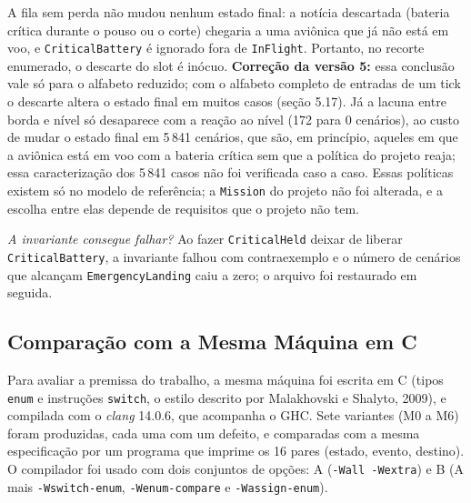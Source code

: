 \documentclass[12pt,a4paper]{article}
\begin{document}
A fila sem perda não mudou nenhum estado final: a notícia descartada (bateria crítica durante o pouso ou o corte) chegaria a uma aviônica que já não está em voo, e \texttt{CriticalBattery} é ignorado fora de \texttt{InFlight}. Portanto, no recorte enumerado, o descarte do slot é inócuo. \textbf{Correção da versão 5:} essa conclusão vale só para o alfabeto reduzido; com o alfabeto completo de entradas de um tick o descarte altera o estado final em muitos casos (seção 5.17). Já a lacuna entre borda e nível só desaparece com a reação ao nível (172 para 0 cenários), ao custo de mudar o estado final em 5\,841 cenários, que são, em princípio, aqueles em que a aviônica está em voo com a bateria crítica sem que a política do projeto reaja; essa caracterização dos 5\,841 casos não foi verificada caso a caso. Essas políticas existem só no modelo de referência; a \texttt{Mission} do projeto não foi alterada, e a escolha entre elas depende de requisitos que o projeto não tem.

\textit{A invariante consegue falhar?} Ao fazer \texttt{CriticalHeld} deixar de liberar \texttt{CriticalBattery}, a invariante falhou com contraexemplo e o número de cenários que alcançam \texttt{EmergencyLanding} caiu a zero; o arquivo foi restaurado em seguida.

\subsection{Comparação com a Mesma Máquina em C}

Para avaliar a premissa do trabalho, a mesma máquina foi escrita em C (tipos \texttt{enum} e instruções \texttt{switch}, o estilo descrito por Malakhovski e Shalyto, 2009), e compilada com o \textit{clang} 14.0.6, que acompanha o GHC. Sete variantes (M0 a M6) foram produzidas, cada uma com um defeito, e comparadas com a mesma especificação por um programa que imprime os 16 pares (estado, evento, destino). O compilador foi usado com dois conjuntos de opções: A (\texttt{-Wall -Wextra}) e B (A mais \texttt{-Wswitch-enum}, \texttt{-Wenum-compare} e \texttt{-Wassign-enum}).
\end{document}
